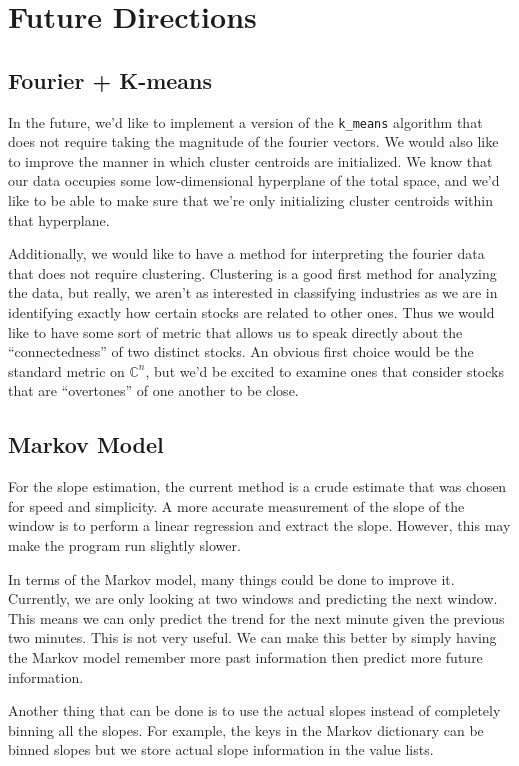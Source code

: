 \documentclass[final]{article}
\begin{document}
\section{Future Directions}
\subsection{Fourier + K-means}
In the future, we'd like to implement a version of the
\texttt{k\_means} algorithm that does not require taking the magnitude
of the fourier vectors. We would also like to improve the manner in
which cluster centroids are initialized. We know that our data
occupies some low-dimensional hyperplane of the total space, and we'd
like to be able to make sure that we're only initializing cluster
centroids within that hyperplane.

Additionally, we would like to have a method for interpreting the
fourier data that does not require clustering. Clustering is a good
first method for analyzing the data, but really, we aren't as
interested in classifying industries as we are in identifying exactly
how certain stocks are related to other ones. Thus we would like to
have some sort of metric that allows us to speak directly about the
``connectedness'' of two distinct stocks. An obvious first choice
would be the standard metric on $\mathbb{C}^n$, but we'd be excited to
examine ones that consider stocks that are ``overtones'' of one
another to be close.


\subsection{Markov Model}
For the slope estimation, the current method is a crude estimate that
was chosen for speed and simplicity. A more accurate measurement of
the slope of the window is to perform a linear regression and extract
the slope. However, this may make the program run slightly slower.

In terms of the Markov model, many things could be done to improve it.
Currently, we are only looking at two windows and predicting the next
window. This means we can only predict the trend for the next minute
given the previous two minutes. This is not very useful. We can make
this better by simply having the Markov model remember more past
information then predict more future information.

Another thing that can be done is to use the actual slopes instead of
completely binning all the slopes. For example, the keys in the Markov
dictionary can be binned slopes but we store actual slope information
in the value lists.
\end{document}
